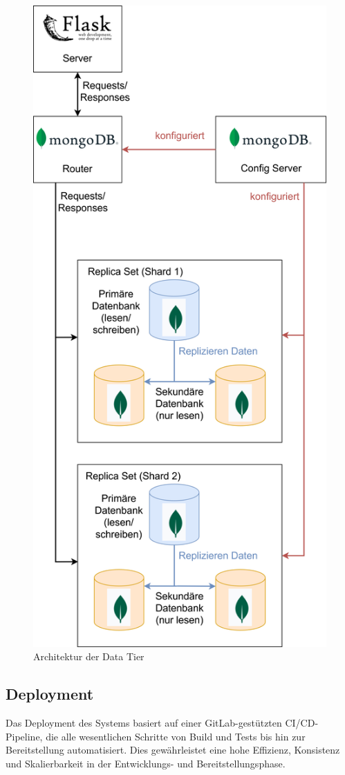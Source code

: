 \documentclass[conference,a4paper,flushend]{cs-techrep}
\begin{document}
\begin{figure}
    \centering
    \includegraphics[width=0.9\linewidth]{DatabaseReplicaSets.png}
    \caption{Architektur der Data Tier}
\end{figure}

\subsection{Deployment}
Das Deployment des Systems basiert auf einer GitLab-gestützten CI/CD-Pipeline, die alle wesentlichen Schritte von Build und Tests bis hin zur Bereitstellung automatisiert. Dies gewährleistet eine hohe Effizienz, Konsistenz und Skalierbarkeit in der Entwicklungs- und Bereitstellungsphase.
\end{document}
